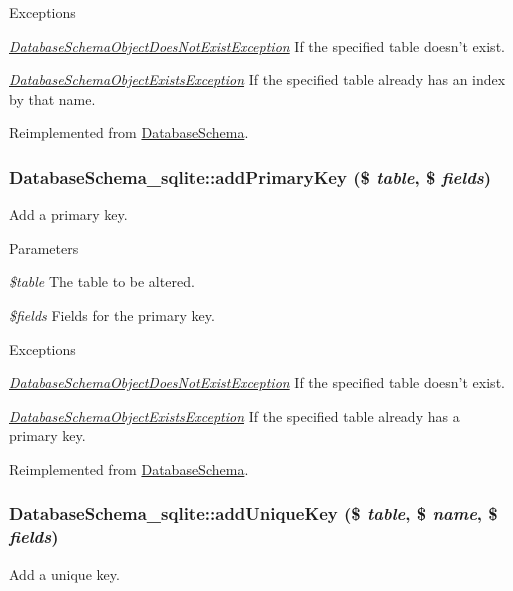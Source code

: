 \begin{DoxyExceptions}{Exceptions}
\item[{\em \hyperlink{classDatabaseSchemaObjectDoesNotExistException}{DatabaseSchemaObjectDoesNotExistException}}]If the specified table doesn't exist. \item[{\em \hyperlink{classDatabaseSchemaObjectExistsException}{DatabaseSchemaObjectExistsException}}]If the specified table already has an index by that name. \end{DoxyExceptions}


Reimplemented from \hyperlink{classDatabaseSchema_a12f4b519abe55aaef3e4d736dbb27ab7}{DatabaseSchema}.\hypertarget{classDatabaseSchema__sqlite_a00b3d8c7ebad2d9ca71d41e3caab7624}{
\subsubsection[{addPrimaryKey}]{\setlength{\rightskip}{0pt plus 5cm}DatabaseSchema\_\-sqlite::addPrimaryKey (\$ {\em table}, \/  \$ {\em fields})}}
\label{classDatabaseSchema__sqlite_a00b3d8c7ebad2d9ca71d41e3caab7624}
Add a primary key.


\begin{DoxyParams}{Parameters}
\item[{\em \$table}]The table to be altered. \item[{\em \$fields}]Fields for the primary key.\end{DoxyParams}

\begin{DoxyExceptions}{Exceptions}
\item[{\em \hyperlink{classDatabaseSchemaObjectDoesNotExistException}{DatabaseSchemaObjectDoesNotExistException}}]If the specified table doesn't exist. \item[{\em \hyperlink{classDatabaseSchemaObjectExistsException}{DatabaseSchemaObjectExistsException}}]If the specified table already has a primary key. \end{DoxyExceptions}


Reimplemented from \hyperlink{classDatabaseSchema_abe9490392e8408eb3847256aeb15bba0}{DatabaseSchema}.\hypertarget{classDatabaseSchema__sqlite_ad180a50d157cd3488cf81f8cc08dd80f}{
\subsubsection[{addUniqueKey}]{\setlength{\rightskip}{0pt plus 5cm}DatabaseSchema\_\-sqlite::addUniqueKey (\$ {\em table}, \/  \$ {\em name}, \/  \$ {\em fields})}}
\label{classDatabaseSchema__sqlite_ad180a50d157cd3488cf81f8cc08dd80f}
Add a unique key.



